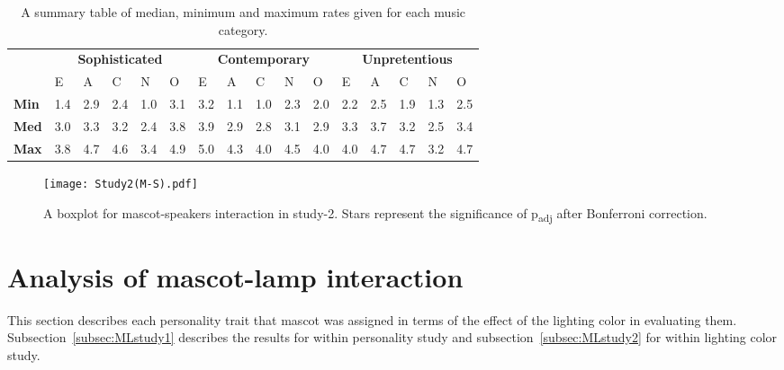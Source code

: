 \begin{table}[H]
    \renewcommand{\arraystretch}{1}
    \begin{center}
        \begin{tabular}{p{}|
        p{}|p{}|p{}|p{}|p{}||
        p{}|p{}|p{}|p{}|p{}||
        p{}|p{}|p{}|p{}|p{}|}
            \cline{2-16}
            & \multicolumn{5}{c||}{\textbf{Sophisticated}} & \multicolumn{5}{c||}{\textbf{Contemporary}}
            & \multicolumn{5}{c|}{\textbf{Unpretentious}} \\
            \cline{2-16}
            & E & A & C & N & O & E & A & C & N & O & E & A & C & N & O     \\
            \cline{2-16}
            \textbf{Min}    & 1.4 & 2.9 & 2.4 & 1.0 & 3.1 & 3.2 & 1.1 & 1.0 & 2.3 & 2.0 & 2.2 & 2.5 & 1.9 & 1.3 & 2.5  \\
            \textbf{Med}    & 3.0 & 3.3 & 3.2 & 2.4 & 3.8 & 3.9 & 2.9 & 2.8 & 3.1 & 2.9 & 3.3 & 3.7 & 3.2 & 2.5 & 3.4   \\
            \textbf{Max}    & 3.8 & 4.7 & 4.6 & 3.4 & 4.9 & 5.0 & 4.3 & 4.0 & 4.5 & 4.0 & 4.0 & 4.7 & 4.7 & 3.2 & 4.7 \\
            \cline{2-16}
        \end{tabular}
        \caption[]{A summary table of median, minimum and maximum rates given for each music category.\footnotemark}
        \label{table:medianMS2}
    \end{center}
\end{table}
\begin{figure}[H]
    \centering
    \texttt{[image: Study2(M-S).pdf]}
    \caption[]{A boxplot for mascot-speakers interaction in study-2.
    Stars represent the significance of p\textsubscript{adj} after Bonferroni correction.\footnotemark}
    \label{fig:MS2}
\end{figure}
\section{Analysis of mascot-lamp interaction}
\label{sec:m-l}
This section describes each personality trait that mascot was assigned in terms of
the effect of the lighting color in evaluating them.
Subsection~\ref{subsec:MLstudy1} describes the results for within personality study and
subsection~\ref{subsec:MLstudy2} for within lighting color study.

